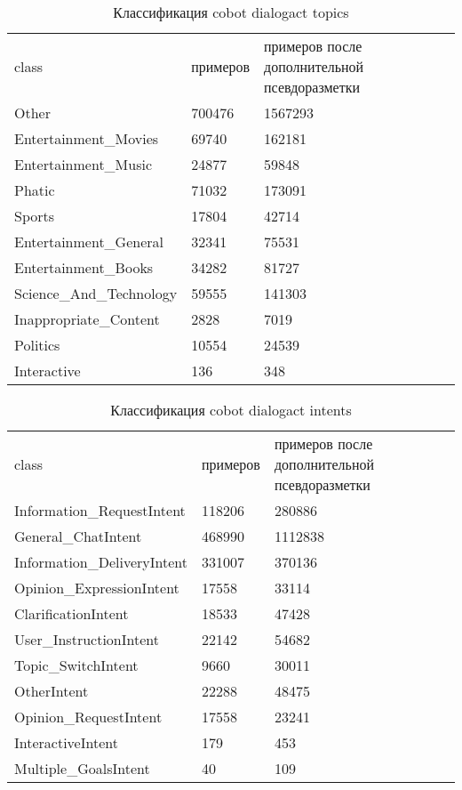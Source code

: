 \begin{table}[]
\caption{Классификация cobot dialogact topics}
\label{appendix:dct}
\begin{tabular}{lll}
class & примеров & примеров после дополнительной псевдоразметки \\
Other & 700476 & {1567293} \\
Entertainment\_Movies & 69740 & {162181} \\
Entertainment\_Music & 24877 & {59848} \\
Phatic & 71032 & 173091 \\
Sports & 17804 & 42714 \\
Entertainment\_General & 32341 & 75531 \\
Entertainment\_Books & 34282 & 81727 \\
Science\_And\_Technology & 59555 & 141303 \\
Inappropriate\_Content & 2828 & 7019 \\
Politics & 10554 & 24539 \\
Interactive & 136 & 348
\end{tabular}
\end{table}


\begin{table}[]
\caption{Классификация cobot dialogact intents}
\label{appendix:dci}
\begin{tabular}{lll}
class & примеров & примеров после дополнительной псевдоразметки \\
Information\_RequestIntent & 118206 & 280886 \\
General\_ChatIntent & 468990 & 1112838 \\
Information\_DeliveryIntent & 331007 & 370136 \\
Opinion\_ExpressionIntent & 17558 & 33114 \\
ClarificationIntent & 18533 & 47428 \\
User\_InstructionIntent & 22142 & 54682 \\
Topic\_SwitchIntent & 9660 & 30011 \\
OtherIntent & 22288 & 48475 \\
Opinion\_RequestIntent & 17558 & 23241 \\
InteractiveIntent & 179 & 453 \\
Multiple\_GoalsIntent & 40 & 109
\end{tabular}
\end{table}